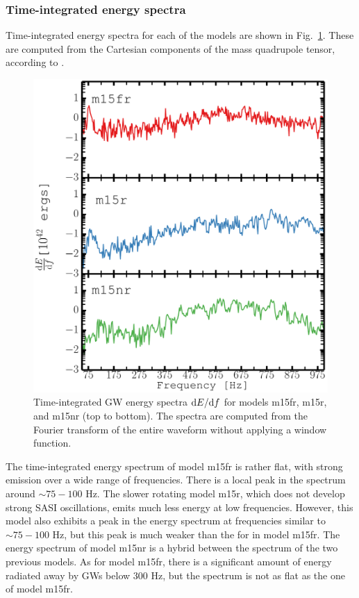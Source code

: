 \subsubsection{Time-integrated energy spectra}
Time-integrated energy spectra for each of the models are shown
in Fig.~\ref{figp2:energy_spectra}. These are computed from
the Cartesian components of the mass quadrupole tensor, according to
.
\begin{figure}[h]
\centering                            
\includegraphics[width=0.79\linewidth]{./images/paper2/dedv_rot.pdf}
\caption{Time-integrated GW energy spectra $\mathrm{d} E/ \mathrm{d} f$ for models m15fr,
m15r, and  m15nr (top to bottom). The spectra
are computed from the Fourier transform of the entire waveform
without applying a window function. 
\label{figp2:energy_spectra}}
\end{figure}
The time-integrated energy spectrum of model m15fr is rather flat, with strong emission over a wide range of frequencies.
There is a local peak in the spectrum around $\sim 75-100$ Hz. The slower rotating model m15r, which does not
develop strong SASI oscillations, emits much less energy at low frequencies. However, this model also
exhibits a peak in the energy spectrum at frequencies similar to $\sim 75-100$ Hz, but
this peak is much weaker than the for in model m15fr.
The energy spectrum of model m15nr is a hybrid between the spectrum of the two previous models. 
As for model m15fr, there is a significant amount of energy radiated away by GWs below 300 Hz, but the spectrum is not as flat as the one of model m15fr. 

